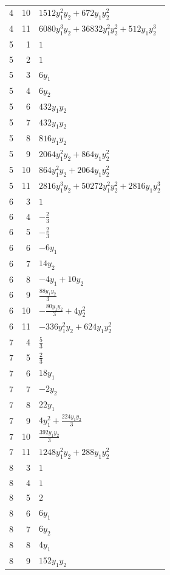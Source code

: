 \documentclass[10pt,a4paper]{article}
\begin{document}
{\begin{longtable}{rrp{125mm}}
4 & 10 & $1512 y_{1}^{2} y_{2} + 672 y_{1} y_{2}^{2}$\\
4 & 11 & $6080 y_{1}^{3} y_{2} + 36832 y_{1}^{2} y_{2}^{2} + 512 y_{1} y_{2}^{3}$\\
5 & 1 & $1$\\
5 & 2 & $1$\\
5 & 3 & $6 y_{1}$\\
5 & 4 & $6 y_{2}$\\
5 & 6 & $432 y_{1} y_{2}$\\
5 & 7 & $432 y_{1} y_{2}$\\
5 & 8 & $816 y_{1} y_{2}$\\
5 & 9 & $2064 y_{1}^{2} y_{2} + 864 y_{1} y_{2}^{2}$\\
5 & 10 & $864 y_{1}^{2} y_{2} + 2064 y_{1} y_{2}^{2}$\\
5 & 11 & $2816 y_{1}^{3} y_{2} + 50272 y_{1}^{2} y_{2}^{2} + 2816 y_{1} y_{2}^{3}$\\
6 & 3 & $1$\\
6 & 4 & $- \frac{2}{3}$\\
6 & 5 & $- \frac{2}{3}$\\
6 & 6 & $- 6 y_{1}$\\
6 & 7 & $14 y_{2}$\\
6 & 8 & $- 4 y_{1} + 10 y_{2}$\\
6 & 9 & $\frac{88 y_{1} y_{2}}{3}$\\
6 & 10 & $- \frac{80 y_{1} y_{2}}{3} + 4 y_{2}^{2}$\\
6 & 11 & $- 336 y_{1}^{2} y_{2} + 624 y_{1} y_{2}^{2}$\\
7 & 4 & $\frac{5}{3}$\\
7 & 5 & $\frac{2}{3}$\\
7 & 6 & $18 y_{1}$\\
7 & 7 & $- 2 y_{2}$\\
7 & 8 & $22 y_{1}$\\
7 & 9 & $4 y_{1}^{2} + \frac{224 y_{1} y_{2}}{3}$\\
7 & 10 & $\frac{392 y_{1} y_{2}}{3}$\\
7 & 11 & $1248 y_{1}^{2} y_{2} + 288 y_{1} y_{2}^{2}$\\
8 & 3 & $1$\\
8 & 4 & $1$\\
8 & 5 & $2$\\
8 & 6 & $6 y_{1}$\\
8 & 7 & $6 y_{2}$\\
8 & 8 & $4 y_{1}$\\
8 & 9 & $152 y_{1} y_{2}$\\

\end{longtable}}
\end{document}
